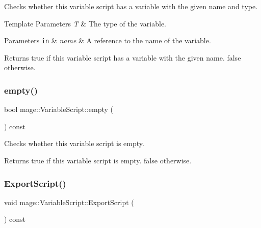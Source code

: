 Checks whether this variable script has a variable with the given name and type.


\begin{DoxyTemplParams}{Template Parameters}
{\em T} & The type of the variable. \\
\hline
\end{DoxyTemplParams}

\begin{DoxyParams}[1]{Parameters}
\mbox{\tt in}  & {\em name} & A reference to the name of the variable. \\
\hline
\end{DoxyParams}
\begin{DoxyReturn}{Returns}
{\ttfamily true} if this variable script has a variable with the given name. {\ttfamily false} otherwise. 
\end{DoxyReturn}
\hypertarget{classmage_1_1_variable_script_a8a3f47783455cd6264dfc996887fd0f0}{}\label{classmage_1_1_variable_script_a8a3f47783455cd6264dfc996887fd0f0} 
\subsubsection{\texorpdfstring{empty()}{empty()}}
{\footnotesize\ttfamily bool mage\+::\+Variable\+Script\+::empty (\begin{DoxyParamCaption}{ }\end{DoxyParamCaption}) const\hspace{0.3cm}{\ttfamily [noexcept]}}

Checks whether this variable script is empty.

\begin{DoxyReturn}{Returns}
{\ttfamily true} if this variable script is empty. {\ttfamily false} otherwise. 
\end{DoxyReturn}
\hypertarget{classmage_1_1_variable_script_ab12b7f789f6af2b301ff350fa401b324}{}\label{classmage_1_1_variable_script_ab12b7f789f6af2b301ff350fa401b324} 
\subsubsection{\texorpdfstring{Export\+Script()}{ExportScript()}\hspace{0.1cm}{\footnotesize\ttfamily [1/2]}}
{\footnotesize\ttfamily void mage\+::\+Variable\+Script\+::\+Export\+Script (\begin{DoxyParamCaption}{ }\end{DoxyParamCaption}) const}

